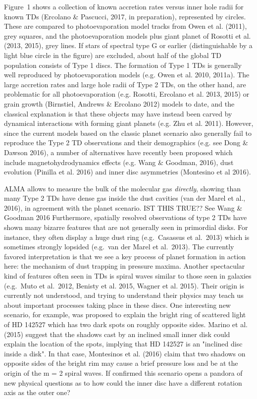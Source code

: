 \documentclass[12pt]{article}
\begin{document}
Figure~1 shows a collection of known accretion rates versus inner hole
radii for known TDs (Ercolano \& Pascucci, 2017, in preparation),
represented by circles. These are compared to photoevaporation model tracks from
Owen et al. (2011), grey squares, and the photoevaporation models plus giant planet
of Rosotti et al. (2013, 2015), grey lines. 
If stars of spectral type G or earlier (distinguishable by a light
blue circle in the figure) are excluded, about half of the global TD population consists of Type 1
discs. The formation of Type 1 TDs is generally well reproduced by
photoevaporation models (e.g. Owen et al. 2010, 2011a). The large accretion rates and large hole
radii of Type 2 TDs, on the other hand, are problematic for all 
photoevaporation (e.g. Rosotti, Ercolano et al. 2013, 2015) or grain
growth (Birnstiel, Andrews \& Ercolano 2012) models to date, and the classical explanation is that
these objects may have instead been carved by dynamical interactions
with forming giant planets (e.g. Zhu et al. 2011). However, since the
current models based on the classic planet scenario also generally
fail to reproduce the Type 2 TD observations and 
their demographics (e.g. see Dong \& Dawson 2016),
a number of alternatives have recently been proposed which include magnetohydrodynamics
effects (e.g. Wang \& Goodman, 2016), dust evolution (Pinilla et
al. 2016) and inner disc asymmetries (Montesino et al 2016). 

ALMA allows to measure the bulk of the molecular gas {\it
  directly}, showing than many Type 2 TDs have dense gas inside the
dust cavities (van der Marel et al., 2016), in agreement with the
planet scenario. {\color{red} IST THIS TRUE?? See Wang \& Goodman 2016}
Furthermore, spatially resolved observations of type
2 TDs have shown many bizarre features that are
not generally seen in primordial disks. For instance, they
  often display a huge dust ring (e.g.~Casassus et al.~2013)
  which is sometimes strongly lopsided (e.g.~van der Marel et al.~2013). The currently favored interpretation is that we see a
  key process of planet formation in action here: the mechanism of dust
  trapping in pressure maxima. Another spectacular kind of features often
  seen in TDs is spiral waves similar to those seen in galaxies
  (e.g.~Muto et al.~2012, Benisty et al. 2015, Wagner et al. 2015). Their origin is currently not
  understood, and trying to understand their physics may teach us about
important processes taking place in these discs. One interesting new
scenario, for example, was proposed to explain the bright ring of scattered light of
HD 142527 which has two dark spots on roughly opposite sides. Marino
et al. (2015) suggest that the shadows cast by an inclined small inner
disk could explain the location of the spots, implying that HD 142527
is an "inclined disc inside a disk". In that case, Montesinos et
al. (2016) claim that two shadows on opposite sides of the
bright rim may cause a brief pressure loss and be at the origin of the
m = 2 spiral waves. If confirmed this scenario opens a pandora of new
physical questions as to how could the inner disc have a different
rotation axis as the outer one?  \\
\end{document}
